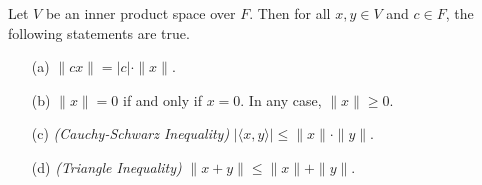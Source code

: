 \begin{theorem}
    Let \( V  \) be an inner product space over \( F  \). Then for all \( x,y \in V  \) and \( c \in F  \), the following statements are true.
    \begin{enumerate}
        \item[(a)] \( \|cx\| = | c  |  \cdot \|x\| \).
        \item[(b)] \( \|x\| = 0  \) if and only if \( x = 0 \). In any case, \( \|x\| \geq 0  \).
        \item[(c)] \textit{(Cauchy-Schwarz Inequality)} \( | \langle x , y \rangle | \leq \|x \| \cdot \| y\|. \) 
        \item[(d)] \textit{(Triangle Inequality)} \( \|x + y \| \leq \| x \| + \| y \|  \).
    \end{enumerate}
\end{theorem}
